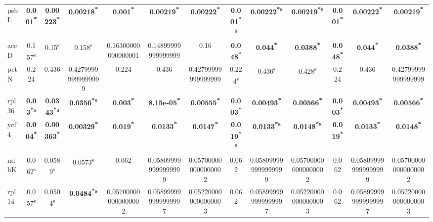 \documentclass[a4paper]{article}
\begin{document}
\begin{longtable}{l|c|c|c|c|c|c|c|c|c|c|c|c}
psbL&\textbf{0.001\textsuperscript{*}}&\textbf{0.00223\textsuperscript{*}}&\textbf{0.00218\textsuperscript{*}}&\textbf{0.001\textsuperscript{*}}&\textbf{0.00219\textsuperscript{*}}&\textbf{0.00222\textsuperscript{*}}&\textbf{0.001\textsuperscript{*}\textsuperscript{s}}&\textbf{0.00222\textsuperscript{*}\textsuperscript{s}}&\textbf{0.00219\textsuperscript{*}\textsuperscript{s}}&\textbf{0.001\textsuperscript{*}}&\textbf{0.00222\textsuperscript{*}}&\textbf{0.00219\textsuperscript{*}}\\
accD&0.157\textsuperscript{s}&0.15\textsuperscript{s}&0.158\textsuperscript{s}&0.16300000000000001&0.14899999999999999&0.16&\textbf{0.048\textsuperscript{*}}&\textbf{0.044\textsuperscript{*}}&\textbf{0.0388\textsuperscript{*}}&\textbf{0.048\textsuperscript{*}}&\textbf{0.044\textsuperscript{*}}&\textbf{0.0388\textsuperscript{*}}\\
petN&0.224&0.436&0.42799999999999999&0.224&0.436&0.42799999999999999&0.224\textsuperscript{s}&0.436\textsuperscript{s}&0.428\textsuperscript{s}&0.224&0.436&0.42799999999999999\\
rpl36&\textbf{0.03\textsuperscript{*}\textsuperscript{s}}&\textbf{0.0343\textsuperscript{*}\textsuperscript{s}}&\textbf{0.0356\textsuperscript{*}\textsuperscript{s}}&\textbf{0.003\textsuperscript{*}}&\textbf{8.15e-05\textsuperscript{*}}&\textbf{0.00555\textsuperscript{*}}&\textbf{0.003\textsuperscript{*}}&\textbf{0.00493\textsuperscript{*}}&\textbf{0.00566\textsuperscript{*}}&\textbf{0.003\textsuperscript{*}}&\textbf{0.00493\textsuperscript{*}}&\textbf{0.00566\textsuperscript{*}}\\
ycf4&\textbf{0.004\textsuperscript{*}}&\textbf{0.00363\textsuperscript{*}}&\textbf{0.00329\textsuperscript{*}}&\textbf{0.019\textsuperscript{*}}&\textbf{0.0133\textsuperscript{*}}&\textbf{0.0147\textsuperscript{*}}&\textbf{0.019\textsuperscript{*}\textsuperscript{s}}&\textbf{0.0133\textsuperscript{*}\textsuperscript{s}}&\textbf{0.0148\textsuperscript{*}\textsuperscript{s}}&\textbf{0.019\textsuperscript{*}}&\textbf{0.0133\textsuperscript{*}}&\textbf{0.0148\textsuperscript{*}}\\
ndhK&0.062\textsuperscript{s}&0.0589\textsuperscript{s}&0.0573\textsuperscript{s}&0.062&0.058099999999999999&0.057000000000000002&0.062&0.058099999999999999&0.057000000000000002&0.062&0.058099999999999999&0.057000000000000002\\
rpl14&0.057\textsuperscript{s}&0.0504\textsuperscript{s}&\textbf{0.0484\textsuperscript{*}\textsuperscript{s}}&0.057000000000000002&0.058999999999999997&0.052200000000000003&0.062&0.058999999999999997&0.052200000000000003&0.062&0.058999999999999997&0.052200000000000003\\

\end{longtable}
\end{document}
